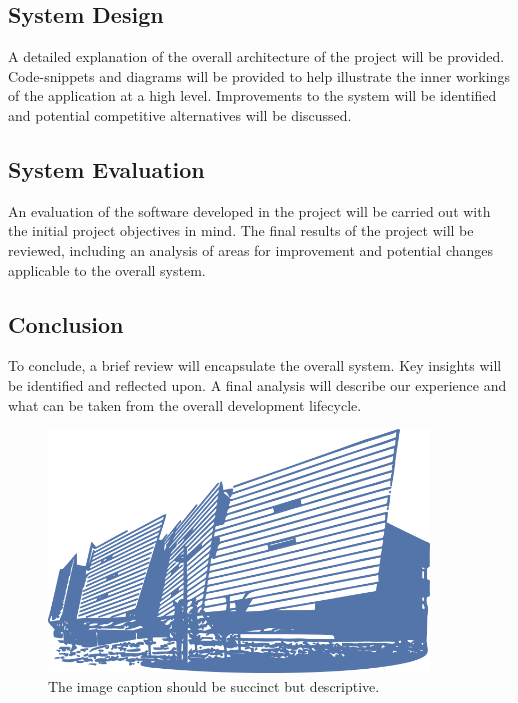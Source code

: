 \subsection{System Design}
A detailed explanation of the overall architecture of the project will be provided. Code-snippets and diagrams will be provided to help illustrate the inner workings of the application at a high level. Improvements to the system will be identified and potential competitive alternatives will be discussed.
\subsection{System Evaluation}
An evaluation of the software developed in the project will be carried out with the initial project objectives in mind. The final results of the project will be reviewed, including an analysis of areas for improvement and potential changes applicable to the overall system.
\subsection{Conclusion}
To conclude, a brief review will encapsulate the overall system. Key insights will be identified and reflected upon. A final analysis will describe our experience and what can be taken from the overall development lifecycle.

\begin{figure}[h!]
	\caption{The image caption should be succinct but descriptive.}
	\label{image:myImageName}
	\centering
	\includegraphics[width=0.9\textwidth]{images/gmit-building.png}
\end{figure}	